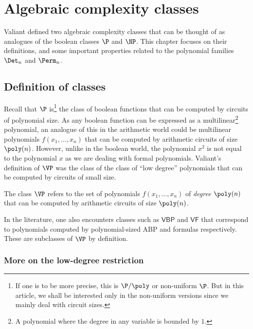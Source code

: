 \chapter{Algebraic complexity classes} \label{chap-vpvnp}

Valiant \cite{v79} defined two algebraic complexity classes that can be thought of as analogues of the boolean classes $\P$ and $\NP$. 
This chapter focuses on their definitions, and some important properties related to the polynomial families $\Det_n$ and $\Perm_n$. 

\section{Definition of classes}

Recall that $\P$ is\footnote{If one is to be more precise, this is $\P/\poly$ or non-uniform $\P$. 
But in this article, we shall be interested only in the non-uniform versions since we mainly deal with circuit sizes.} the class of boolean functions that can be computed by circuits of polynomial size. 
As any boolean function can be expressed as a multilinear\footnote{A polynomial where the degree in any variable is bounded by $1$.} polynomial, an analogue of this in the arithmetic world could be multilinear polynomials $f(x_1,\dots, x_n)$ that can be computed by arithmetic circuits of size $\poly(n)$. 
However, unlike in the boolean world, the polynomial $x^2$ is not equal to the polynomial $x$ as we are dealing with formal polynomials. 
Valiant's definition of $\VP$ was the class of the class of ``low degree'' polynomials that can be computed by circuits of small size. 

\begin{definition}[Valiant's $\P$]\label{defn:vp}
The class $\VP$ refers to the set of polynomials $f(x_1,\dots, x_n)$ of \emph{degree $\poly(n)$} that can be computed by arithmetic circuits of size $\poly(n)$. 
\end{definition}

In the literature, one also encounters classes such as $\mathsf{VBP}$ and $\mathsf{VF}$ that correspond to polynomials computed by polynomial-sized ABP and formulas respectively. 
These are subclasses of $\VP$ by definition. 


\subsection*{More on the low-degree restriction}

